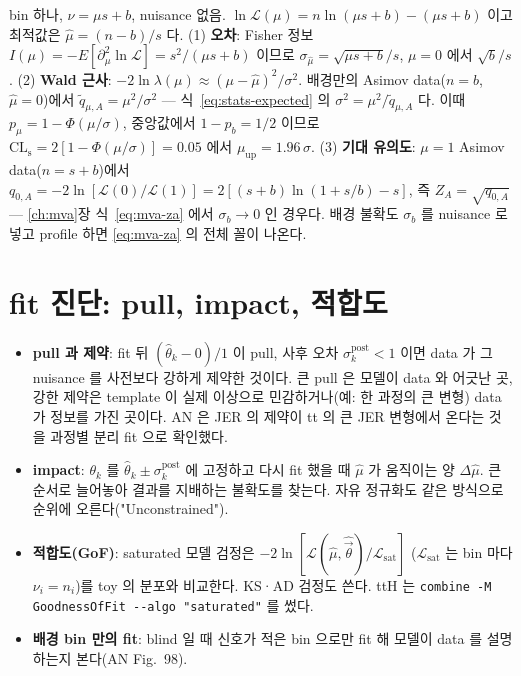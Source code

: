 \begin{note}
bin 하나, $\nu=\mu s+b$, nuisance 없음. $\ln\mathcal{L}(\mu)=n\ln(\mu s+b)-(\mu s+b)$ 이고 최적값은 $\hat\mu=(n-b)/s$ 다.
(1) \textbf{오차}: Fisher 정보 $I(\mu)=-E[\partial^2_\mu\ln\mathcal{L}]=s^2/(\mu s+b)$ 이므로 $\sigma_{\hat\mu}=\sqrt{\mu s+b}/s$, $\mu=0$ 에서 $\sqrt b/s$.
(2) \textbf{Wald 근사}: $-2\ln\lambda(\mu)\approx(\mu-\hat\mu)^2/\sigma^2$. 배경만의 Asimov data($n=b$, $\hat\mu=0$)에서 $\tilde q_{\mu,A}=\mu^2/\sigma^2$ — 식~\eqref{eq:stats-expected} 의
$\sigma^2=\mu^2/\tilde q_{\mu,A}$ 다. 이때 $p_\mu=1-\Phi(\mu/\sigma)$, 중앙값에서 $1-p_b=1/2$ 이므로 $\mathrm{CL_s}=2[1-\Phi(\mu/\sigma)]=0.05$ 에서 $\mu_{\mathrm{up}}=1.96\,\sigma$.
(3) \textbf{기대 유의도}: $\mu=1$ Asimov data($n=s+b$)에서 $q_{0,A}=-2\ln[\mathcal{L}(0)/\mathcal{L}(1)]=2[(s+b)\ln(1+s/b)-s]$, 즉 $Z_A=\sqrt{q_{0,A}}$ —
\ref{ch:mva}장 식~\eqref{eq:mva-za} 에서 $\sigma_b\to0$ 인 경우다. 배경 불확도 $\sigma_b$ 를 nuisance 로 넣고 profile 하면 \eqref{eq:mva-za} 의 전체 꼴이 나온다.
\end{note}

\section{fit 진단: pull, impact, 적합도}\label{sec:stats-diag}

\begin{itemize}
\item \textbf{pull 과 제약}: fit 뒤 $(\hat\theta_k-0)/1$ 이 pull, 사후 오차 $\sigma_k^{\mathrm{post}}<1$ 이면 data 가 그 nuisance 를 사전보다 강하게 제약한 것이다.
  큰 pull 은 모델이 data 와 어긋난 곳, 강한 제약은 template 이 실제 이상으로 민감하거나(예: 한 과정의 큰 변형) data 가 정보를 가진 곳이다. AN 은 JER 의
  제약이 tt 의 큰 JER 변형에서 온다는 것을 과정별 분리 fit 으로 확인했다.
\item \textbf{impact}: $\theta_k$ 를 $\hat\theta_k\pm\sigma_k^{\mathrm{post}}$ 에 고정하고 다시 fit 했을 때 $\hat\mu$ 가 움직이는 양 $\Delta\hat\mu$. 큰 순서로 늘어놓아 결과를
  지배하는 불확도를 찾는다. 자유 정규화도 같은 방식으로 순위에 오른다("Unconstrained").
\item \textbf{적합도(GoF)}: saturated 모델 검정은 $-2\ln[\mathcal{L}(\hat\mu,\hat{\vec\theta})/\mathcal{L}_{\mathrm{sat}}]$ ($\mathcal{L}_{\mathrm{sat}}$ 는 bin 마다
  $\nu_i=n_i$)를 toy 의 분포와 비교한다. KS·AD 검정도 쓴다. ttH 는 \texttt{combine -M GoodnessOfFit -{}-algo "saturated"} 를 썼다.
\item \textbf{배경 bin 만의 fit}: blind 일 때 신호가 적은 bin 으로만 fit 해 모델이 data 를 설명하는지 본다(AN Fig.~98).
\end{itemize}

